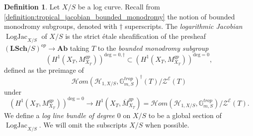 \documentclass[a4paper,11pt]{amsart} %
\numberwithin{equation}{subsection}
\newcommand{\on}[1]{\operatorname{#1}}
\newcommand{\bb}[1]{{\mathbb{#1}}}
\newcommand{\ca}[1]{{\mathcal{#1}}}
\newcommand{\bd}[1]{{\mathbf{#1}}}
\def\sheafhom{\mathcal{H}om}
\newcommand{\cat}[1]{\bd{#1}}
\def\Logjac{\operatorname{LogJac}}
\def\o#1{\overline{#1}}
\theoremstyle{definition}
\newtheorem{definition}{Definition}[section]
\theoremstyle{plain}%
\theoremstyle{remark}
\newtheorem{remark}[definition]{Remark}
\begin{document}

\begin{definition}\label{definition:log_jacobians}
    Let $X/S$ be a log curve. Recall from \ref{definition:tropical_jacobian_bounded_monodromy} the notion of bounded monodromy subgroups, denoted with $\dagger$ superscripts. The \emph{logarithmic Jacobian} $\Logjac_{X/S}$ of $X/S$ is the strict \'etale sheafification of the presheaf $(\cat{LSch}/S)^{op} \to \cat{Ab}$ taking $T$ to the \emph{bounded monodromy subgroup}
    \[
    (H^1(X_T,M_{X_T}^{gp}))^{\mathrm{deg}=0,\dagger} \subset (H^1(X_T,M_{X_T}^{gp}))^{\mathrm{deg}=0},
    \]
    defined as the preimage of
    \[
    \sheafhom(\ca H_{1,X/S},\bb G_{m,S}^{trop})^\dagger(T)/\ca Z^{\ca E}(T)
    \]
    under
    \[
    (H^1(X_T,M_{X_T}^{gp}))^{\mathrm{deg}=0} \to H^1(X_T,\o M_{X_T}^{gp}) = \sheafhom(\ca H_{1,X/S},\bb G_{m,S}^{trop})/\ca Z^{\ca E}(T). 
    \]
    We define a \emph{log line bundle of degree $0$} on $X/S$ to be a global section of $\on{LogJac}_{X/S}$. We will omit the subscripts $X/S$ when possible.
\end{definition}
\end{document}
